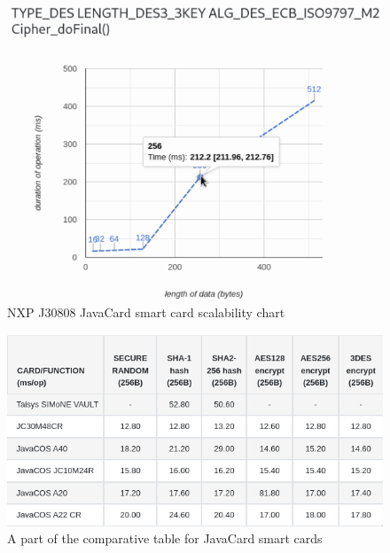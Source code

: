 \begin{figure}[H]
    \centering
    \includegraphics[width=\textwidth]{img/visualizations/NXP J3A080-scalability-DES3.png}
    \caption{NXP J30808 JavaCard smart card scalability chart}
\end{figure}

\begin{figure}[H]
    \centering
    \includegraphics[width=\textwidth]{img/visualizations/jc-comparative-table.png}
    \caption{A part of the comparative table for JavaCard smart cards}
    \label{fig:my_label}
\end{figure}


\renewcommand{\thechapter}{C}

